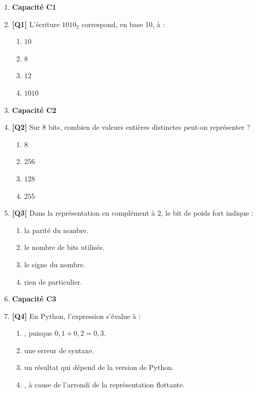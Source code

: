 \begin{enumerate}

\item[] \textbf{Capacité C1}

\item \textbf{[Q1]} L'écriture $1010_2$ correspond, en base 10, à :
  \begin{enumerate}[label=\Alph*.]
    \item $10$
    \item $8$
    \item $12$
    \item $1010$
  \end{enumerate}

\item[] \textbf{Capacité C2}

\item \textbf{[Q2]} Sur $8$ bits, combien de valeurs entières distinctes peut-on représenter ?
  \begin{enumerate}[label=\Alph*.]
    \item $8$
    \item $256$
    \item $128$
    \item $255$
  \end{enumerate}

\item \textbf{[Q3]} Dans la représentation en complément à 2, le bit de poids fort indique :
  \begin{enumerate}[label=\Alph*.]
    \item la parité du nombre.
    \item le nombre de bits utilisés.
    \item le signe du nombre.
    \item rien de particulier.
  \end{enumerate}

\item[] \textbf{Capacité C3}

\item \textbf{[Q4]} En Python, l'expression  s'évalue à :
  \begin{enumerate}[label=\Alph*.]
    \item {}, puisque $0{,}1+0{,}2=0{,}3$.
    \item une erreur de syntaxe.
    \item un résultat qui dépend de la version de Python.
    \item {}, à cause de l'arrondi de la représentation flottante.
  \end{enumerate}


\end{enumerate}
